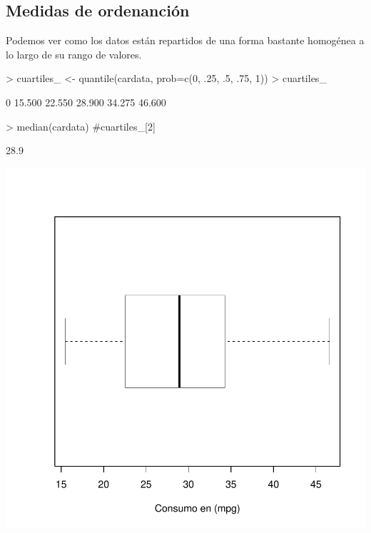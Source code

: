 \documentclass [a4paper] {article}
\begin{document}
\subsection{Medidas de ordenanción}
Podemos ver como los datos están repartidos de una forma bastante homogénea a lo largo de su rango de valores.
\begin{Schunk}
\begin{Sinput}
> cuartiles_ <- quantile(cardata, prob=c(0, .25, .5, .75, 1))
> cuartiles_
\end{Sinput}
\begin{Soutput}
    0%
15.500 22.550 28.900 34.275 46.600 
\end{Soutput}
\begin{Sinput}
> median(cardata) #cuartiles_[2]
\end{Sinput}
\begin{Soutput}
[1] 28.9
\end{Soutput}
\end{Schunk}
\begin{center}
\includegraphics{entrega-ordenacion_cardata_plot}
\end{center}

\newpage
\end{document}
